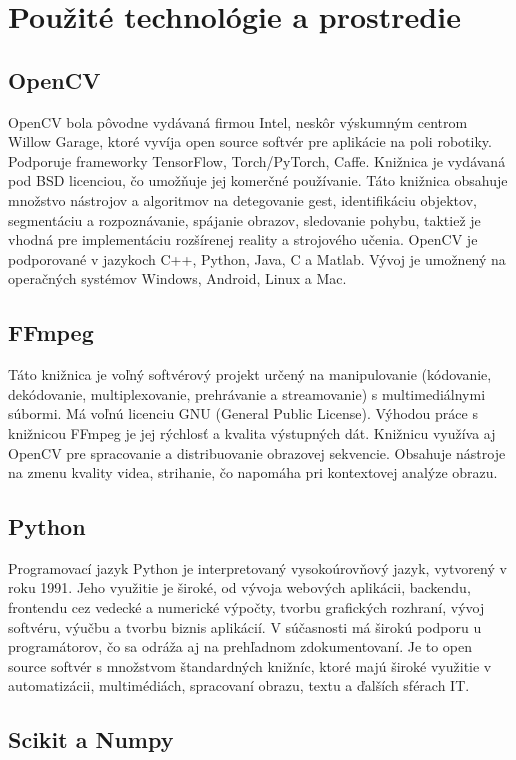 \section{Použité technológie a prostredie}
\subsection{OpenCV}
\acrfull{OpenCV} bola pôvodne vydávaná firmou Intel, neskôr výskumným centrom Willow Garage, ktoré vyvíja open source softvér pre aplikácie na poli robotiky. Podporuje frameworky TensorFlow, Torch/PyTorch, Caffe. Knižnica je vydávaná pod BSD licenciou, čo umožňuje jej komerčné používanie. Táto knižnica obsahuje množstvo nástrojov a algoritmov na detegovanie gest, identifikáciu objektov, segmentáciu a rozpoznávanie, spájanie obrazov, sledovanie pohybu, taktiež je vhodná pre implementáciu rozšírenej reality a strojového učenia. OpenCV je podporované v jazykoch C++, Python, Java, C a Matlab. Vývoj je umožnený na operačných systémov Windows, Android, Linux a Mac. \cite{c4}


\subsection{FFmpeg}
Táto knižnica je voľný softvérový projekt určený na manipulovanie (kódovanie, dekódovanie, multiplexovanie, prehrávanie a streamovanie) s multimediálnymi súbormi. Má voľnú licenciu GNU (General Public License). Výhodou práce s knižnicou FFmpeg je jej rýchlosť a kvalita výstupných dát. Knižnicu využíva aj OpenCV pre spracovanie a distribuovanie obrazovej sekvencie. Obsahuje nástroje na zmenu kvality videa, strihanie, čo napomáha pri kontextovej analýze obrazu.\cite{c9}

\subsection{Python}
Programovací jazyk Python je interpretovaný vysokoúrovňový jazyk, vytvorený v roku 1991. Jeho využitie je široké, od vývoja webových aplikácii, backendu, frontendu cez vedecké a numerické výpočty, tvorbu grafických rozhraní, vývoj softvéru, výučbu a tvorbu biznis aplikácií. V súčasnosti má širokú podporu u programátorov, čo sa odráža aj na prehľadnom zdokumentovaní. Je to open source softvér s množstvom štandardných knižníc, ktoré majú široké využitie v automatizácii, multimédiách, spracovaní obrazu, textu a ďalších sférach IT.\cite{c6}
\subsection{Scikit a Numpy}

